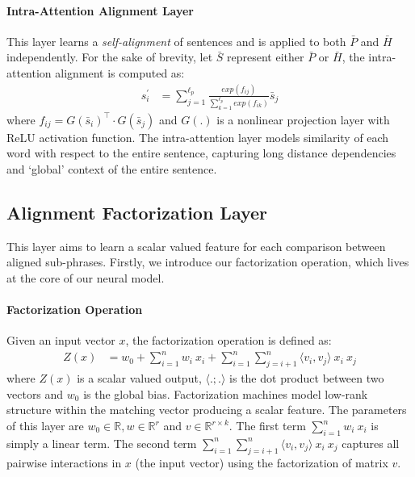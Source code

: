 \documentclass[11pt,a4paper]{article}
\begin{document}
\paragraph{Intra-Attention Alignment Layer}
This layer learns a \textit{self-alignment} of sentences and is applied to both $\bar{P}$ and $\bar{H}$ independently. For the sake of brevity, let $\bar{S}$ represent either $\bar{P}$ or $\bar{H}$, the intra-attention alignment is computed as:
\begin{align}
s^{\prime}_i &= \sum^{\ell_{p}}_{j=1} \frac{exp(f_{ij})}{\sum_{k=1}^{\ell_{p}} exp(f_{ik})} \bar{s}_{j}
\end{align}
where $f_{ij} = G(\bar{s}_i)^\top\cdot G(\bar{s}_j)$ and $G(.)$ is a nonlinear projection layer with ReLU activation function. The intra-attention layer models similarity of each word with respect to the entire sentence, capturing long distance dependencies and `global' context of the entire sentence.

\subsection{Alignment Factorization Layer}
This layer aims to learn a scalar valued feature for each comparison between aligned sub-phrases. Firstly, we introduce our factorization operation, which lives at the core of our neural model.
\paragraph{Factorization Operation}
Given an input vector $x$, the factorization operation \cite{rendle2010factorization} is defined as:
\begin{align}
Z(x) &= w_{0} + \sum^{n}_{i=1} w_i \: x_i  + \sum^{n}_{i=1} \sum^{n}_{j=i+1} \langle v_i, v_j \rangle \: x_i \:x_j
\end{align}
where $Z(x)$ is a scalar valued output, $\langle .;. \rangle$ is the dot product between two vectors and $w_{0}$ is the global bias. Factorization machines model low-rank structure within the matching vector producing a scalar feature.  The parameters of this layer are $w_{0} \in \mathbb{R}, w \in \mathbb{R}^{r}$ and $v \in \mathbb{R}^{r \times k}$. The first term $\sum^{n}_{i=1} w_i \: x_i$ is simply a linear term. The second term $ \sum^{n}_{i=1} \sum^{n}_{j=i+1} \langle v_i, v_j \rangle \: x_i \:x_j$ captures all pairwise interactions in $x$ (the input vector) using the factorization of matrix $v$.
\end{document}
